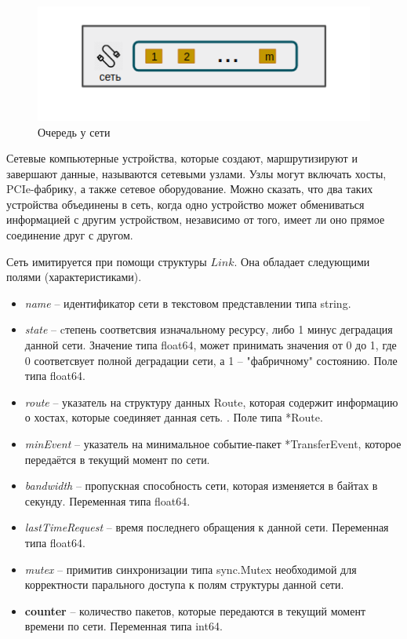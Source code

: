 \begin{figure}[t!]
	\centering
	\includegraphics[width=\textwidth]{Kenenbek/link_queue.png}
	\caption{Очередь у сети}
	\label{fig:linkqueue}
\end{figure}

Сетевые компьютерные устройства, которые создают, маршрутизируют и завершают данные, называются сетевыми узлами. Узлы могут включать хосты, PCIe-фабрику, а также сетевое оборудование. Можно сказать, что два таких устройства объединены в сеть, когда одно устройство может обмениваться информацией с другим устройством, независимо от того, имеет ли оно прямое соединение друг с другом.

Сеть имитируется при помощи структуры $Link$. Она обладает следующими полями (характеристиками). 
\begin{itemize}
	\item  \textit{name} -- идентификатор сети в текстовом представлении типа string. 
	\item \textit{state} -- cтепень соответсвия изначальному ресурсу, либо 1 минус деградация данной сети. Значение типа float64, может принимать значения от 0 до 1, где 0 соответсвует полной деградации сети, а 1 -- "фабричному" состоянию. Поле типа float64. 

	\item \textit{route} -- указатель на структуру данных Route, которая содержит информацию о хостах, которые соединяет данная сеть. . Поле типа *Route.

	\item \textit{minEvent} -- указатель на минимальное событие-пакет *TransferEvent, которое передаётся в текущий момент по сети. 

	\item \textit{bandwidth} -- пропускная способность сети, которая изменяется в байтах в секунду. Переменная типа float64. 

	\item \textit{lastTimeRequest} -- время последнего обращения к данной сети. Переменная типа float64.

	\item \textit{mutex} -- примитив синхронизации типа sync.Mutex необходимой для корректности парального доступа к полям структуры данной сети.

	\item \textbf{counter} -- количество пакетов, которые передаются в текущий момент времени по сети. Переменная типа int64.

\end{itemize}

